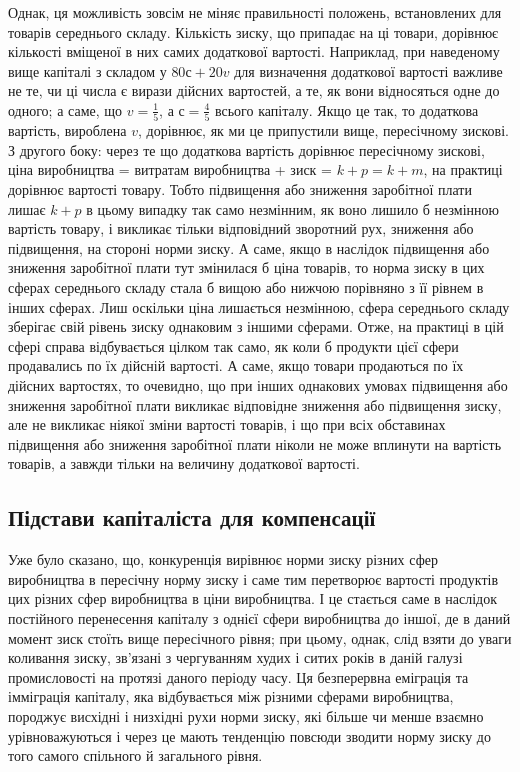 Однак, ця можливість зовсім не міняє правильності положень, встановлених для товарів
середнього складу. Кількість зиску, що припадає на ці товари, дорівнює кількості вміщеної в них
самих додаткової вартості. Наприклад, при наведеному вище капіталі з складом у $80 с + 20 v$ для
визначення додаткової вартості важливе не те, чи ці числа є вирази дійсних вартостей, а те, як вони
відносяться одне до одного; а саме, що $v = \frac{1}{5}$, а $с = \frac{4}{5}$  всього капіталу. Якщо це так, то
додаткова вартість, вироблена $v$, дорівнює, як ми це припустили вище, пересічному зискові. З другого
боку: через те що додаткова вартість дорівнює пересічному зискові, ціна виробництва = витратам
виробництва + зиск = $k + p = k + m$, на практиці дорівнює вартості товару. Тобто підвищення або
зниження заробітної плати лишає $k + p$  в цьому випадку так само незмінним, як воно лишило б
незмінною вартість товару, і викликає тільки відповідний зворотний рух,
зниження або підвищення, на стороні норми зиску. А саме, якщо в наслідок підвищення або зниження
заробітної плати тут змінилася б ціна товарів, то норма зиску в цих сферах середнього складу стала б
вищою або нижчою порівняно з її рівнем в інших
сферах. Лиш оскільки ціна лишається незмінною, сфера
середнього складу зберігає свій рівень зиску однаковим з іншими сферами. Отже, на практиці в цій
сфері справа відбувається цілком так само, як коли б продукти цієї сфери продавались по їх дійсній
вартості. А саме, якщо товари продаються по їх дійсних вартостях, то очевидно, що при інших
однакових умовах підвищення або зниження заробітної плати викликає відповідне зниження або підвищення зиску,
але не викликає ніякої зміни вартості товарів, і що при всіх обставинах підвищення або зниження
заробітної плати ніколи не може вплинути на вартість товарів, а завжди тільки на величину додаткової
вартості.

\subsection{Підстави капіталіста для компенсації}

Уже було сказано, що, конкуренція вирівнює норми зиску різних сфер виробництва в пересічну норму
зиску і саме тим перетворює вартості продуктів цих різних сфер виробництва в ціни виробництва. І це
стається саме в наслідок постійного перенесення капіталу з однієї сфери виробництва до іншої, де в
даний момент зиск стоїть вище пересічного рівня; при цьому, однак, слід взяти до уваги коливання
зиску, зв’язані з чергуванням худих і ситих років в даній галузі промисловості на протязі даного
періоду часу. Ця безперервна еміграція та імміграція капіталу, яка відбувається між різними сферами
виробництва, породжує висхідні і низхідні рухи норми зиску, які більше чи менше взаємно
урівноважуються і через це мають тенденцію повсюди зводити норму зиску до того самого спільного й загального рівня.

